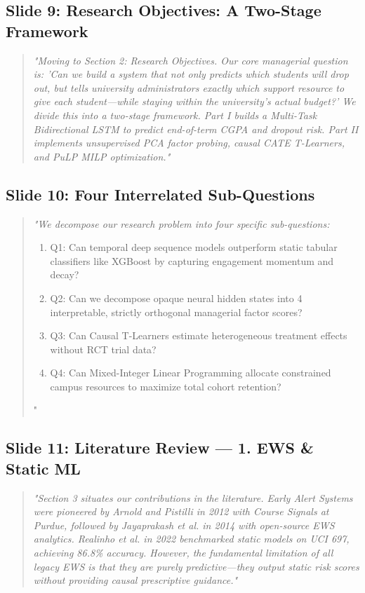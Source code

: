 \documentclass[11pt, a4paper]{article}
\begin{document}
\subsection{Slide 9: Research Objectives: A Two-Stage Framework}
\begin{quote}\small \itshape
"Moving to Section 2: Research Objectives. Our core managerial question is: 'Can we build a system that not only predicts which students will drop out, but tells university administrators exactly which support resource to give each student---while staying within the university's actual budget?' We divide this into a two-stage framework. Part I builds a Multi-Task Bidirectional LSTM to predict end-of-term CGPA and dropout risk. Part II implements unsupervised PCA factor probing, causal CATE T-Learners, and PuLP MILP optimization."
\end{quote}

\subsection{Slide 10: Four Interrelated Sub-Questions}
\begin{quote}\small \itshape
"We decompose our research problem into four specific sub-questions:
\begin{enumerate}
    \item Q1: Can temporal deep sequence models outperform static tabular classifiers like XGBoost by capturing engagement momentum and decay?
    \item Q2: Can we decompose opaque neural hidden states into 4 interpretable, strictly orthogonal managerial factor scores?
    \item Q3: Can Causal T-Learners estimate heterogeneous treatment effects without RCT trial data?
    \item Q4: Can Mixed-Integer Linear Programming allocate constrained campus resources to maximize total cohort retention?
\end{enumerate}"
\end{quote}

\subsection{Slide 11: Literature Review --- 1. EWS \& Static ML}
\begin{quote}\small \itshape
"Section 3 situates our contributions in the literature. Early Alert Systems were pioneered by Arnold and Pistilli in 2012 with Course Signals at Purdue, followed by Jayaprakash et al. in 2014 with open-source EWS analytics. Realinho et al. in 2022 benchmarked static models on UCI 697, achieving 86.8\% accuracy. However, the fundamental limitation of all legacy EWS is that they are purely predictive---they output static risk scores without providing causal prescriptive guidance."
\end{quote}
\end{document}
